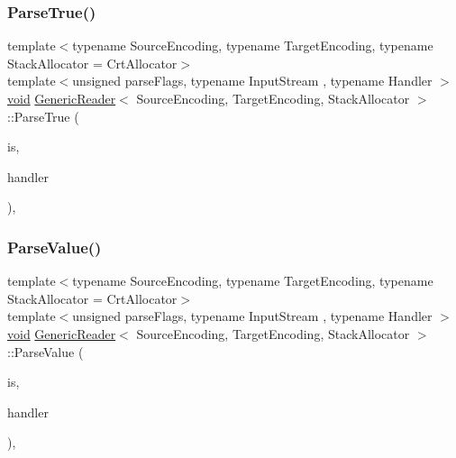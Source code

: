 \mbox{\label{classGenericReader_a762f074e0f99c71f0a82cff19bb763cd}} 
\subsubsection{\texorpdfstring{Parse\+True()}{ParseTrue()}}
{\footnotesize\ttfamily template$<$typename Source\+Encoding, typename Target\+Encoding, typename Stack\+Allocator = Crt\+Allocator$>$ \\
template$<$unsigned parse\+Flags, typename Input\+Stream , typename Handler $>$ \\
\hyperlink{imgui__impl__opengl3__loader_8h_ac668e7cffd9e2e9cfee428b9b2f34fa7}{void} \hyperlink{classGenericReader}{Generic\+Reader}$<$ Source\+Encoding, Target\+Encoding, Stack\+Allocator $>$\+::Parse\+True (\begin{DoxyParamCaption}\item[{Input\+Stream \&}]{is,  }\item[{Handler \&}]{handler }\end{DoxyParamCaption})\hspace{0.3cm}{\ttfamily [inline]}, {\ttfamily [private]}}

\mbox{\label{classGenericReader_a8c0d07512c0fa447f45c9e5b00dd2d70}} 
\subsubsection{\texorpdfstring{Parse\+Value()}{ParseValue()}}
{\footnotesize\ttfamily template$<$typename Source\+Encoding, typename Target\+Encoding, typename Stack\+Allocator = Crt\+Allocator$>$ \\
template$<$unsigned parse\+Flags, typename Input\+Stream , typename Handler $>$ \\
\hyperlink{imgui__impl__opengl3__loader_8h_ac668e7cffd9e2e9cfee428b9b2f34fa7}{void} \hyperlink{classGenericReader}{Generic\+Reader}$<$ Source\+Encoding, Target\+Encoding, Stack\+Allocator $>$\+::Parse\+Value (\begin{DoxyParamCaption}\item[{Input\+Stream \&}]{is,  }\item[{Handler \&}]{handler }\end{DoxyParamCaption})\hspace{0.3cm}{\ttfamily [inline]}, {\ttfamily [private]}}

